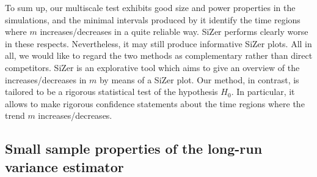

To sum up, our multiscale test exhibits good size and power properties in the simulations, and the minimal intervals produced by it identify the time regions where $m$ increases/decreases in a quite reliable way. SiZer performs clearly worse in these respects. Nevertheless, it may still produce informative SiZer plots. %
All in all, we would like to regard the two methods as complementary rather than direct competitors. SiZer is an explorative tool which aims to give an overview of the increases/decreases in $m$ by means of a SiZer plot. Our method, in contrast, is tailored to be a rigorous statistical test of the hypothesis $H_0$. In particular, it allows to make rigorous confidence statements about the time regions where the trend $m$ increases/decreases. %


\subsection{Small sample properties of the long-run variance estimator}\label{subsec-sim-3}


